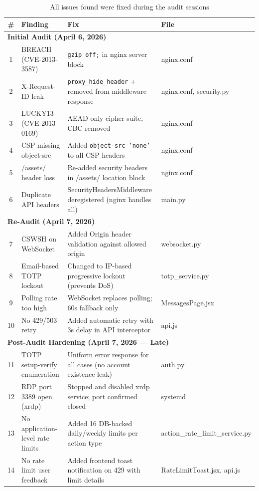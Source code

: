\documentclass[12pt,a4paper]{article}
\begin{document}
\begin{table}[H]
\centering
\begin{tabularx}{\textwidth}{clXl}
\toprule
\textbf{\#} & \textbf{Finding} & \textbf{Fix} & \textbf{File} \\
\midrule
\multicolumn{4}{l}{\textbf{Initial Audit (April 6, 2026)}} \\
\midrule
1 & BREACH (CVE-2013-3587) & \texttt{gzip off;} in nginx server block & nginx.conf \\
2 & X-Request-ID leak & \texttt{proxy\_hide\_header} + removed from middleware response & nginx.conf, security.py \\
3 & LUCKY13 (CVE-2013-0169) & AEAD-only cipher suite, CBC removed & nginx.conf \\
4 & CSP missing object-src & Added \texttt{object-src 'none'} to all CSP headers & nginx.conf \\
5 & /assets/ header loss & Re-added security headers in /assets/ location block & nginx.conf \\
6 & Duplicate API headers & SecurityHeadersMiddleware deregistered (nginx handles all) & main.py \\
\midrule
\multicolumn{4}{l}{\textbf{Re-Audit (April 7, 2026)}} \\
\midrule
7 & CSWSH on WebSocket & Added Origin header validation against allowed origin & websocket.py \\
8 & Email-based TOTP lockout & Changed to IP-based progressive lockout (prevents DoS) & totp\_service.py \\
9 & Polling rate too high & WebSocket replaces polling; 60s fallback only & MessagesPage.jsx \\
10 & No 429/503 retry & Added automatic retry with 3s delay in API interceptor & api.js \\
\midrule
\multicolumn{4}{l}{\textbf{Post-Audit Hardening (April 7, 2026 --- Late)}} \\
\midrule
11 & TOTP setup-verify enumeration & Uniform error response for all cases (no account existence leak) & auth.py \\
12 & RDP port 3389 open (xrdp) & Stopped and disabled xrdp service; port confirmed closed & systemd \\
13 & No application-level rate limits & Added 16 DB-backed daily/weekly limits per action type & action\_rate\_limit\_service.py \\
14 & No rate limit user feedback & Added frontend toast notification on 429 with limit details & RateLimitToast.jsx, api.js \\
\bottomrule
\end{tabularx}
\caption{All issues found were fixed during the audit sessions}
\end{table}
\end{document}

